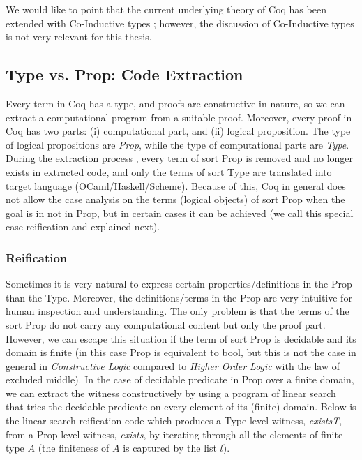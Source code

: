  
\noindent
We would like to point that the current underlying theory of Coq has been 
extended with Co-Inductive types \citep{10.1007/3-540-60579-7_3}; however, 
the discussion of Co-Inductive types is not very relevant for this thesis.	

 
\subsection{Type vs. Prop: Code Extraction}
\label{sec:typeprop}
 Every term in Coq has
 a type, and proofs
 are constructive in nature, so
 we can extract a computational program from 
 a suitable proof.  Moreover, every proof in Coq 
 has two parts: (i) computational part, and (ii) logical 
 proposition.
 The type of logical propositions are \textit{Prop}, while the type of 
 computational parts are \textit{Type}. During the extraction process \citep{Letouzey:2008:ECO}, 
 every term of sort Prop is removed and no longer exists in extracted 
 code, and only the terms of sort Type are translated into target language
 (OCaml/Haskell/Scheme). Because of this, Coq in general does not allow
 the case analysis on
 the terms (logical objects) of sort Prop   when the goal is in not in Prop, 
 but in certain cases it can be achieved (we call this special 
 case reification and explained next). 
 
 
  
  \subsubsection{Reification}
  \label{sec:reification}
  Sometimes it is very natural to express certain properties/definitions
  in the Prop than the Type. Moreover, the definitions/terms in the Prop are very 
  intuitive for human inspection 
  and understanding. The only problem is that the terms of the sort Prop do not carry any 
  computational content but only the proof part. However, 
  we can escape this situation if the term of sort Prop is decidable and its domain is finite (in this 
  case Prop is equivalent to bool, but this is not the case 
  in general in \textit{Constructive Logic} compared to 
  \textit{Higher Order Logic} 
  with the law of excluded middle). 
  In the case of decidable predicate in Prop over a finite domain,  we can extract 
  the witness constructively by using 
  a program of linear search that tries the decidable predicate on 
  every element of its (finite) domain. Below is the linear search 
  reification code 
  which produces a Type level witness, \textit{existsT},
  from a Prop level witness, \textit{exists}, by iterating 
  through all the elements of finite type $A$ (the finiteness 
  of $A$ is captured by the list $l$).
  
